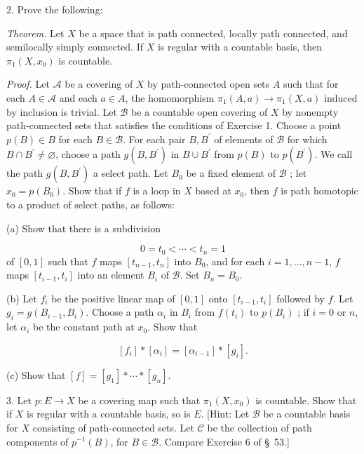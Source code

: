 2. Prove the following:

\textsl{Theorem.}
	Let \(X\) be a space that is path connected, locally path connected, and semilocally simply connected. If \(X\) is regular with a countable basis, then \({\pi }_{1}( {X,x_{0}})\) is countable.

\textsl{Proof.}
	Let \(\mathcal{A}\) be a covering of \(X\) by path-connected open sets \(A\) such that for each \(A \in \mathcal{A}\) and each \(a \in A\), the homomorphism \({\pi }_{1}( {A,a}) \rightarrow {\pi }_{1}( {X,a})\) induced by inclusion is trivial. Let \(\mathcal{B}\) be a countable open covering of \(X\) by nonempty path-connected sets that satisfies the conditions of Exercise 1. Choose a point \(p( B) \in B\) for each \(B \in \mathcal{B}\). For each pair \(B,B^{\prime }\) of elements of \(\mathcal{B}\) for which \(B \cap {B}^{\prime } \neq \varnothing\), choose a path \(g( {B,B^{\prime }})\) in \(B \cup {B}^{\prime }\) from \(p( B)\) to \(p( B^{\prime })\). We call the path \(g( {B,B^{\prime }})\) a select path.
Let \(B_{0}\) be a fixed element of \(\mathcal{B}\) ; let \(x_{0} = p( B_{0})\). Show that if \(f\) is a loop in \(X\) based at \(x_{0}\), then \(f\) is path homotopic to a product of select paths, as follows:

(a) Show that there is a subdivision

\[
0 = t_{0} < \cdots < t_{n} = 1
\]
of \([ {0,1}]\) such that \(f\) maps \([ {t_{n - 1},t_{n}}]\) into \(B_{0}\), and for each \(i = 1,\ldots, n - 1\), \(f\) maps \([ {t_{i - 1},t_{i}}]\) into an element \(B_{i}\) of \(\mathcal{B}\). Set \(B_{n} = B_{0}\).

(b) Let \(f_{i}\) be the positive linear map of \([ {0,1}]\) onto \([ {t_{i - 1},t_{i}}]\) followed by \(f\). Let \(g_{i} = g( {B_{i - 1},B_{i}})\). Choose a path \({\alpha }_{i}\) in \(B_{i}\) from \(f( t_{i})\) to \(p( B_{i})\) ; if \(i = 0\) or \(n\), let \({\alpha }_{i}\) be the constant path at \(x_{0}\). Show that

\[
[ f_{i}] * [ {\alpha }_{i}] = [ {\alpha }_{i - 1}] * [ g_{i}] .
\]

(c) Show that \([ f] = [ g_{1}] * \cdots * [ g_{n}]\).

3. Let \(p : E \rightarrow X\) be a covering map such that \({\pi }_{1}( {X,x_{0}})\) is countable. Show that if \(X\) is regular with a countable basis, so is \(E\). [Hint: Let \(\mathcal{B}\) be a countable basis for \(X\) consisting of path-connected sets. Let \(\mathcal{C}\) be the collection of path components of \(p^{-1}( B)\), for \(B \in \mathcal{B}\). Compare Exercise 6 of \S\ 53.]

